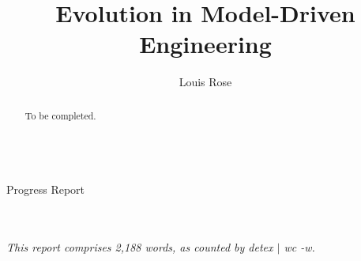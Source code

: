 \documentclass[a4paper,10pt]{article}
\title{Evolution in Model-Driven Engineering}
\author{Louis Rose}
\makeatletter
\renewcommand{\maketitle}{
  \begin{titlepage}
    \center
    \vspace*{\stretch{1}}
    \textsf{\huge \bfseries\sf \@title}\\
    \bigskip
    {\LARGE Progress Report}\\
    \vspace*{\stretch{1}}
    {\Large \@author}\\
    \bigskip
    {\Large \@date}\\
    \vspace*{\stretch{2}}
  \end{titlepage}
}
\makeatother
\begin{document}

\maketitle

\begin{abstract}
To be completed.
\end{abstract}

\vspace{2mm}

\begin{center}
  \small{\textit{This report comprises 2,188 words, as counted by detex $|$ wc -w.}}
\end{center}

\newpage
\tableofcontents
\newpage








\end{document}

